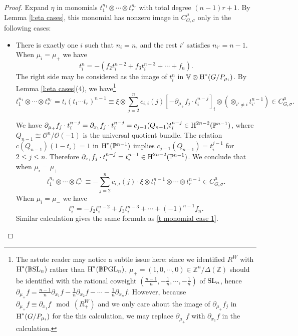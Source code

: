 \documentclass[reqno]{amsart}
\numberwithin{equation}{subsection}
\theoremstyle{definition}
\def\BB{\mathbb{B}}
\def\PP{\mathbb{P}}
\def\VV{\mathbb{V}}
\def\ZZ{\mathbb{Z}}
\newcommand\cO{\mathcal{O}}
\newcommand\PGL{\textup{PGL}}
\newcommand\SL{\textup{SL}}
\newcommand\ot{\otimes}
\newcommand{\cohog}[2]{\textup{H}^{#1}({#2})}     %
\newcommand\D\Delta
\newcommand{\s}{\sigma}
\newcommand{\y}{\eta}
\newcommand\pl{\partial}
\begin{document}
\begin{proof}


Expand $\y$ in monomials $t_1^{n_1}\ot \cdots \ot t_r^{n_r}$ with total degree $(n-1)r+1$.  By Lemma \ref{l:eta cases}, this monomial has nonzero image in $C^\mu_{G,\s}$ only in the following cases:
\begin{itemize}
    \item There is exactly one $i$ such that $n_i=n$, and the rest $i'$ satisfies $n_{i'}=n-1$. When $\mu_i=\mu_+$ we have
    \begin{equation*}
        t_i^n=-(f_2 t_i^{n-2}+f_3t_i^{n-3}+\cdots+f_n).
    \end{equation*}
    The right side may be considered as the image of $t_i^n$ in $\VV\ot \cohog{*}{G/P_{\mu_i}}$.
    By Lemma \ref{l:eta cases}(4), we have\footnote{The astute reader may notice a subtle issue here: since we identified $R^W$ with $\cohog{*}{\BB\SL_n}$ rather than $\cohog{*}{\BB \PGL_n}$, $\mu_+=(1,0,\cdots, 0)\in \ZZ^{n}/\D(\ZZ)$ should be identified with the rational coweight $(\frac{n-1}{n}, -\frac{1}{n},\cdots, -\frac{1}{n})$ of $\SL_n$, hence $\pl_{\mu_+}f=\frac{n-1}{n}\pl_{x_1}f-\frac{1}{n}\pl_{x_2}f-\cdots-\frac{1}{n}\pl_{x_n}f$. However, because $\pl_{\mu_+}f\equiv\pl_{x_1}f\mod (R^W_+)$ and we only care about the image of $\pl_{\mu_+}f_j$ in $\cohog{*}{G/P_{\mu_i}}$ for the this calculation, we may replace $\pl_{\mu_+}f$ with $\pl_{x_1}f$ in the calculation.}
    \begin{equation*}
        t_1^{n_1}\ot \cdots \ot t_r^{n_r}=t_i(t_1\cdots t_r)^{n-1}\equiv \xi\ot\sum_{j=2}^nc_{i,i}(j)[-\pl_{\mu_+}f_j \cdot t_i^{n-j}]_{i}\ot (\ot_{i'\ne i} t_{i'}^{n-1})\in C^\mu_{G,\s}.
    \end{equation*}
    
    We have
    $\pl_{\mu_+}f_j \cdot t_i^{n-j}=\pl_{x_1}f_j\cdot t_i^{n-j}=c_{j-1}(Q_{n-1})t_i^{n-j}\in \cohog{2n-2}{\PP^{n-1}}$, where $Q_{n-1}\cong \cO^n/\cO(-1)$ is the universal quotient bundle. The relation $c(Q_{n-1})(1-t_i)=1$ in $\cohog{*}{\PP^{n-1}}$ implies $c_{j-1}(Q_{n-1})=t_i^{j-1}$ for $2\le j\le n$. Therefore $\pl_{x_1}f_j \cdot t_i^{n-j}=t_i^{n-1}\in \cohog{2n-2}{\PP^{n-1}}$. We conclude that when $\mu_i=\mu_+$
    \begin{equation}\label{t monomial case 1}
        t_1^{n_1}\ot \cdots\ot t_r^{n_r}\equiv -\sum_{j=2}^nc_{i,i}(j)\cdot \xi\ot t_1^{n-1}\ot\cdots \ot t_r^{n-1}\in C^\mu_{G,\s}.
    \end{equation}
    When $\mu_i=\mu_-$ we have
    \begin{equation*}
        t_i^n=-f_2 t_i^{n-2}+f_3t_i^{n-3}+\cdots+(-1)^{n-1}f_n.
    \end{equation*}
    Similar calculation gives the same formula as \eqref{t monomial case 1}.


\end{itemize}
\end{proof}
\end{document}
